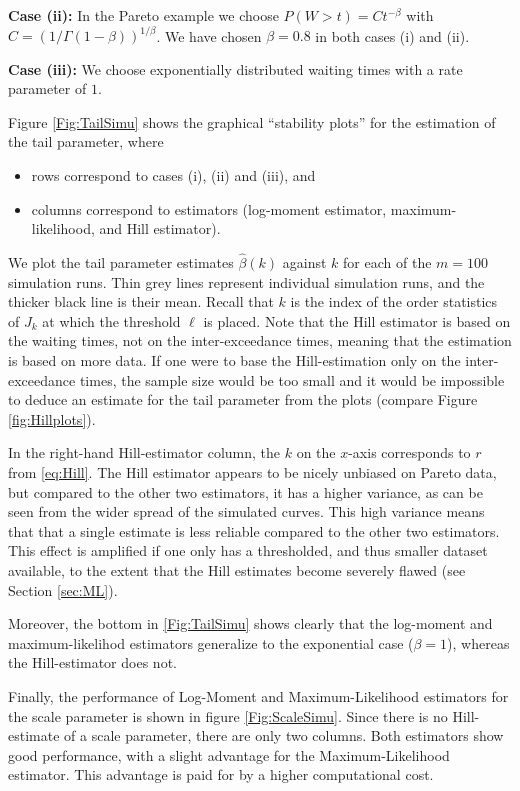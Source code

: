 \documentclass[]{elsarticle} %
\providecommand{\tightlist}{%
  \setlength{\itemsep}{0pt}\setlength{\parskip}{0pt}}
\begin{document}
\textbf{Case (ii):} In the Pareto example we choose
\(P(W>t)=Ct^{-\beta}\) with \(C=(1/\Gamma(1-\beta))^{1/\beta}\). We have
chosen \(\beta=0.8\) in both cases (i) and (ii).

\textbf{Case (iii):} We choose exponentially distributed waiting times
with a rate parameter of \(1\).

Figure \ref{Fig:TailSimu} shows the graphical ``stability plots'' for
the estimation of the tail parameter, where

\begin{itemize}
\tightlist
\item
  rows correspond to cases (i), (ii) and (iii), and
\item
  columns correspond to estimators (log-moment estimator,
  maximum-likelihood, and Hill estimator).
\end{itemize}

We plot the tail parameter estimates \(\hat \beta(k)\) against \(k\) for
each of the \(m=100\) simulation runs. Thin grey lines represent
individual simulation runs, and the thicker black line is their mean.
Recall that \(k\) is the index of the order statistics of \(J_k\) at
which the threshold \(\ell\) is placed. Note that the Hill estimator is
based on the waiting times, not on the inter-exceedance times, meaning
that the estimation is based on more data. If one were to base the
Hill-estimation only on the inter-exceedance times, the sample size
would be too small and it would be impossible to deduce an estimate for
the tail parameter from the plots (compare Figure \ref{fig:Hillplots}).

In the right-hand Hill-estimator column, the \(k\) on the \(x\)-axis
corresponds to \(r\) from \eqref{eq:Hill}. The Hill estimator appears to
be nicely unbiased on Pareto data, but compared to the other two
estimators, it has a higher variance, as can be seen from the wider
spread of the simulated curves. This high variance means that that a
single estimate is less reliable compared to the other two estimators.
This effect is amplified if one only has a thresholded, and thus smaller
dataset available, to the extent that the Hill estimates become severely
flawed (see Section \ref{sec:ML}).

Moreover, the bottom in \ref{Fig:TailSimu} shows clearly that the
log-moment and maximum-likelihod estimators generalize to the
exponential case (\(\beta = 1\)), whereas the Hill-estimator does not.

Finally, the performance of Log-Moment and Maximum-Likelihood estimators
for the scale parameter is shown in figure \ref{Fig:ScaleSimu}. Since
there is no Hill-estimate of a scale parameter, there are only two
columns. Both estimators show good performance, with a slight advantage
for the Maximum-Likelihood estimator. This advantage is paid for by a
higher computational cost.
\end{document}
